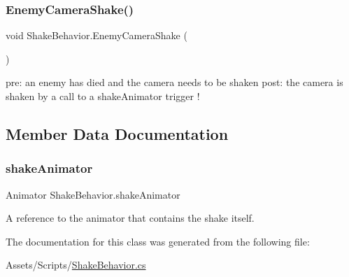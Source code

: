 \subsubsection{\texorpdfstring{EnemyCameraShake()}{EnemyCameraShake()}}
{\footnotesize\ttfamily void Shake\+Behavior.\+Enemy\+Camera\+Shake (\begin{DoxyParamCaption}{ }\end{DoxyParamCaption})}

pre\+: an enemy has died and the camera needs to be shaken post\+: the camera is shaken by a call to a shake\+Animator trigger ! 

\subsection{Member Data Documentation}
\mbox{\label{class_shake_behavior_aae508c1977572a978bd931512057da10}} 
\subsubsection{\texorpdfstring{shakeAnimator}{shakeAnimator}}
{\footnotesize\ttfamily Animator Shake\+Behavior.\+shake\+Animator}



A reference to the animator that contains the shake itself. 



The documentation for this class was generated from the following file\+:\begin{DoxyCompactItemize}
\item 
Assets/\+Scripts/\mbox{\hyperlink{_shake_behavior_8cs}{Shake\+Behavior.\+cs}}\end{DoxyCompactItemize}
